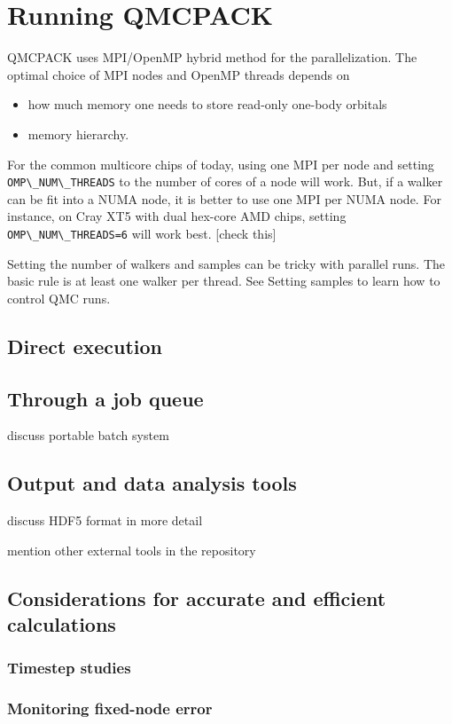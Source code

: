 \chapter{Running QMCPACK}
QMCPACK uses MPI/OpenMP hybrid method for the parallelization. The optimal choice of MPI nodes and OpenMP threads depends on
\begin{itemize}
\item{} how much memory one needs to store read-only one-body orbitals
\item{} memory hierarchy.
\end{itemize}

For the common multicore chips of today, using one MPI per node and setting \verb|OMP\_NUM\_THREADS| to the number of cores of a node will work. But, if a walker can be fit into a NUMA node, it is better to use one MPI per NUMA node. For instance, on Cray XT5 with dual hex-core AMD chips, setting \verb|OMP\_NUM\_THREADS=6| will work best. [check this]

Setting the number of walkers and samples can be tricky with parallel runs. The basic rule is at least one walker per thread.  See Setting samples to learn how to control QMC runs.

\section{Direct execution}
\section{Through a job queue}

discuss portable batch system
\section{Output and data analysis tools}
discuss HDF5 format in more detail

mention other external tools in the repository
\section{Considerations for accurate and efficient calculations}
\subsection{Timestep studies}
\subsection{Monitoring fixed-node error}
